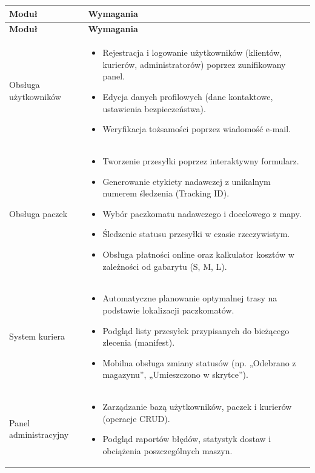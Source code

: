 \begin{tabularx}{\textwidth}{|l|>{\raggedright\arraybackslash}X|}
\caption{Zestawienie wymagań funkcjonalnych} \label{tab:wymagania_funkcjonalne} \\
\hline
\textbf{Moduł} & \textbf{Wymagania} \\ \hline
\endfirsthead
\hline
\textbf{Moduł} & \textbf{Wymagania} \\ \hline
\endhead
\hline
\endfoot
Obsługa użytkowników &
\begin{itemize}
    \item Rejestracja i logowanie użytkowników (klientów, kurierów, administratorów) poprzez zunifikowany panel.
    \item Edycja danych profilowych (dane kontaktowe, ustawienia bezpieczeństwa).
    \item Weryfikacja tożsamości poprzez wiadomość e-mail.
\end{itemize} \\ \hline
Obsługa paczek &
\begin{itemize}
    \item Tworzenie przesyłki poprzez interaktywny formularz.
    \item Generowanie etykiety nadawczej z unikalnym numerem śledzenia (Tracking ID).
    \item Wybór paczkomatu nadawczego i docelowego z mapy.
    \item Śledzenie statusu przesyłki w czasie rzeczywistym.
    \item Obsługa płatności online oraz kalkulator kosztów w zależności od gabarytu (S, M, L).
\end{itemize} \\ \hline
System kuriera &
\begin{itemize}
    \item Automatyczne planowanie optymalnej trasy na podstawie lokalizacji paczkomatów.
    \item Podgląd listy przesyłek przypisanych do bieżącego zlecenia (manifest).
    \item Mobilna obsługa zmiany statusów (np. „Odebrano z magazynu”, „Umieszczono w skrytce”).
\end{itemize} \\ \hline
Panel administracyjny &
\begin{itemize}
    \item Zarządzanie bazą użytkowników, paczek i kurierów (operacje CRUD).
    \item Podgląd raportów błędów, statystyk dostaw i obciążenia poszczególnych maszyn.

\end{itemize}
\end{tabularx}

